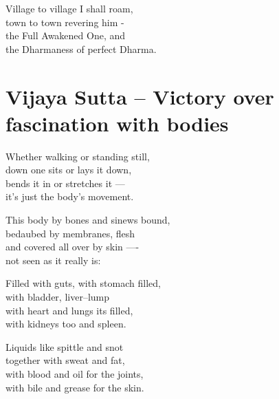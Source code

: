 \begin{MyDescription}{}
Village to village I shall roam,\\
town to town revering him -\\
the Full Awakened One, and\\
the Dharmaness of perfect Dharma.
\end{MyDescription}  

\begin{MyDescription}[(Sn. 181--192)]{}
\end{MyDescription}    
  
   
   
\chapter{Vijaya Sutta -- Victory over fascination with bodies}

\begin{MyDescription}{}
Whether walking or standing still,\\
down one sits or lays it down,\\
bends it in or stretches it —\\
it's just the body's movement.
\end{MyDescription}

\begin{MyDescription}{}
This body by bones and sinews bound,\\
bedaubed by membranes, ﬂesh\\
and covered all over by skin —-\\
not seen as it really is:
\end{MyDescription}

\begin{MyDescription}{}
Filled with guts, with stomach ﬁlled,\\
with bladder, liver--lump\\
with heart and lungs its ﬁlled,\\
with kidneys too and spleen.
\end{MyDescription}

\begin{MyDescription}{}
Liquids like spittle and snot\\
together with sweat and fat,\\
with blood and oil for the joints,\\
with bile and grease for the skin.
\end{MyDescription}

